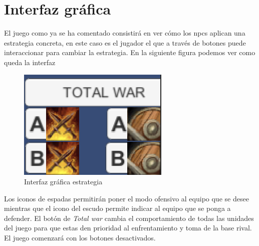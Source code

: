 \section{Interfaz gráfica}
El juego como ya se ha comentado consistirá en ver cómo los npcs aplican una estrategia concreta, en este caso es el jugador el que a través de botones puede interaccionar para cambiar la estrategia. En la siguiente figura podemos ver como queda la interfaz
\begin{figure}[H]
    \centering
    \includegraphics{buttons.png}
    \caption{Interfaz gráfica estrategia}
    \label{fig:mainButtons}
\end{figure}
Los iconos de espadas permitirán poner el modo ofensivo al equipo que se desee mientras que el icono del escudo permite indicar al equipo que se ponga a defender. El botón de \textit{Total war} cambia el comportamiento de todas las unidades del juego para que estas den prioridad al enfrentamiento y toma de la base rival. El juego comenzará con los botones desactivados.

